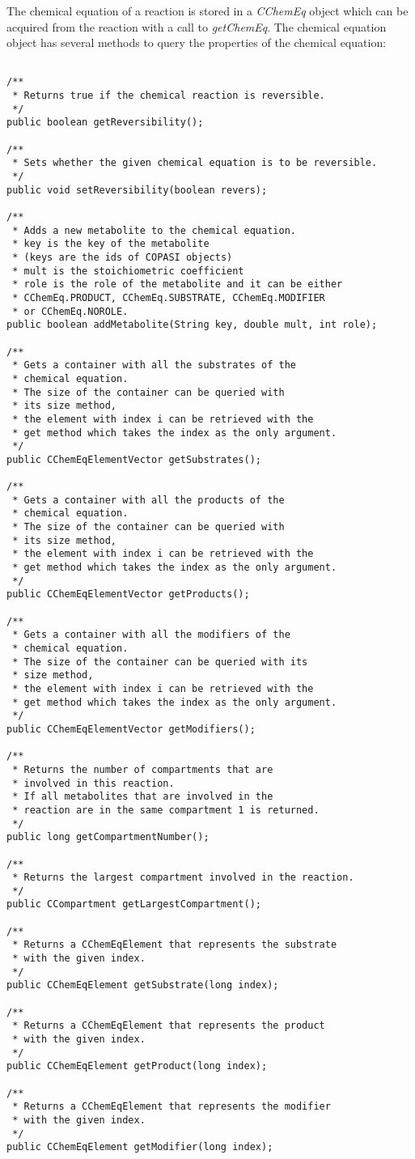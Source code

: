 \documentclass[a4,10pt]{article}
\begin{document}
The chemical equation of a reaction is stored in a \textit{CChemEq} object which can be acquired from the reaction with a call to \textit{getChemEq}.
The chemical equation object has several methods to query the properties of the chemical equation:

\begin{lstlisting}

/**
 * Returns true if the chemical reaction is reversible.
 */
public boolean getReversibility();

/**
 * Sets whether the given chemical equation is to be reversible.
 */
public void setReversibility(boolean revers);

/**
 * Adds a new metabolite to the chemical equation.
 * key is the key of the metabolite 
 * (keys are the ids of COPASI objects)
 * mult is the stoichiometric coefficient
 * role is the role of the metabolite and it can be either
 * CChemEq.PRODUCT, CChemEq.SUBSTRATE, CChemEq.MODIFIER 
 * or CChemEq.NOROLE.
public boolean addMetabolite(String key, double mult, int role);

/**
 * Gets a container with all the substrates of the 
 * chemical equation.
 * The size of the container can be queried with
 * its size method,
 * the element with index i can be retrieved with the
 * get method which takes the index as the only argument.
 */
public CChemEqElementVector getSubstrates();

/**
 * Gets a container with all the products of the 
 * chemical equation.
 * The size of the container can be queried with 
 * its size method,
 * the element with index i can be retrieved with the
 * get method which takes the index as the only argument.
 */
public CChemEqElementVector getProducts();

/**
 * Gets a container with all the modifiers of the
 * chemical equation.
 * The size of the container can be queried with its
 * size method,
 * the element with index i can be retrieved with the 
 * get method which takes the index as the only argument.
 */
public CChemEqElementVector getModifiers();

/**
 * Returns the number of compartments that are 
 * involved in this reaction.
 * If all metabolites that are involved in the
 * reaction are in the same compartment 1 is returned.
 */
public long getCompartmentNumber();

/**
 * Returns the largest compartment involved in the reaction.
 */
public CCompartment getLargestCompartment();

/**
 * Returns a CChemEqElement that represents the substrate
 * with the given index.
 */
public CChemEqElement getSubstrate(long index);

/**
 * Returns a CChemEqElement that represents the product
 * with the given index.
 */
public CChemEqElement getProduct(long index);

/**
 * Returns a CChemEqElement that represents the modifier
 * with the given index.
 */
public CChemEqElement getModifier(long index);
\end{lstlisting}
\end{document}
